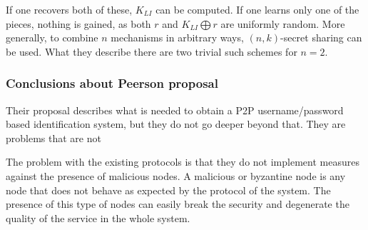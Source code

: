   If one recovers both of these, $K_{LI}$ can be computed. If one learns only one
 of the pieces, nothing is gained, as both $r$ and $K_{LI} \bigoplus r$ are
 uniformly random. More generally, to combine $n$ mechanisms
  in arbitrary ways, $(n, k)$-secret sharing can be used. What they
 describe there are two trivial such schemes for $n = 2$.\\





\subsubsection{Conclusions about Peerson proposal}

Their proposal describes what is needed to obtain a P2P username/password based
identification system, but they do not go deeper beyond that. They are problems
that are not 

%
%
%

The problem with the existing protocols is that they do not implement measures against the presence of malicious nodes.
A malicious or byzantine node is any node that does
not behave as expected by the protocol of the system. The presence of this type
of nodes can easily break the security and degenerate the quality of the
service in the whole system.
